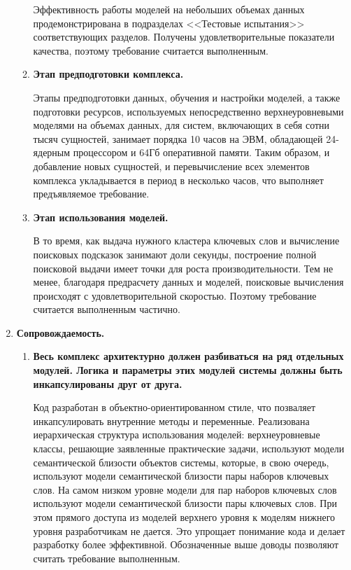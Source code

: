 \begin{enumerate}
\begin{enumerate}[label*=\arabic*.]
            Эффективность работы моделей на небольших объемах данных продемонстрирована в подразделах <<Тестовые испытания>> соответствующих разделов. Получены удовлетворительные показатели качества, поэтому требование считается выполненным.

        \item \textbf{Этап предподготовки комплекса.}

            Этапы предподготовки данных, обучения и настройки моделей, а также  подготовки ресурсов, используемых непосредственно верхнеуровневыми моделями на объемах данных, для систем, включающих в себя сотни тысяч сущностей, занимает порядка 10 часов на ЭВМ, обладающей 24-ядерным процессором и 64Гб оперативной памяти. Таким образом, и добавление новых сущностей, и перевычисление всех элементов комплекса укладывается в период в несколько часов, что выполняет предъявляемое требование.

        \item \textbf{Этап использования моделей.}

            В то время, как выдача нужного кластера ключевых слов и вычисление поисковых подсказок занимают доли секунды, построение полной поисковой выдачи имеет точки для роста производительности. Тем не менее, благодаря предрасчету данных и моделей, поисковые вычисления происходят с удовлетворительной скоростью. Поэтому требование считается выполненным частично.

    \end{enumerate}
    \item \textbf{Сопровождаемость.}
    \begin{enumerate}[label*=\arabic*.]
        \item  \textbf{Весь комплекс архитектурно должен разбиваться на ряд отдельных модулей. Логика и параметры этих модулей системы должны быть инкапсулированы друг от друга.}

            Код разработан в объектно-ориентированном стиле, что позваляет инкапсулировать внутренние методы и переменные. Реализована иерархическая структура использования моделей: верхнеуровневые классы, решающие заявленные практические задачи, используют модели семантической близости объектов системы, которые, в свою очередь, используют модели семантической близости пары наборов ключевых слов. На самом низком уровне модели для пар наборов ключевых слов используют модели семантической близости пары ключевых слов. При этом прямого доступа из моделей верхнего уровня к моделям нижнего уровня разработчикам не дается. Это упрощает понимание кода и делает разработку более эффективной. Обозначенные выше доводы позволяют считать требование выполненным.


\end{enumerate}
\end{enumerate}

